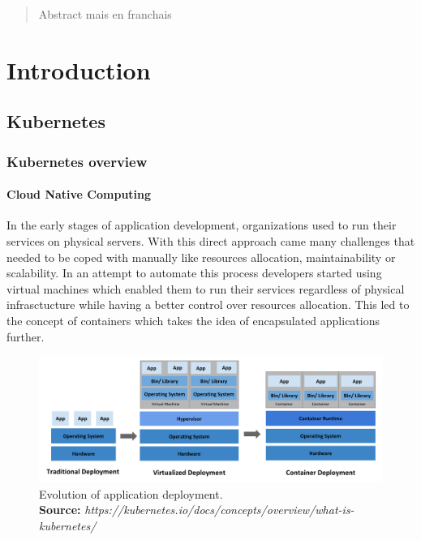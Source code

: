 \documentclass[12pt, a4paper]{memoir}
\newcommand*{\captionsource}[2]{%
    \caption[{#1}]{%
        #1%
        \\\hspace{\linewidth}%
	\textbf{Source:} \textit{#2}%
    }%
}
\begin{document}
\renewcommand\abstractname{R\'esum\'e}
\begin{abstract} 
	Abstract mais en franchais
\end{abstract}

\tableofcontents* %
\normalsize

\mainmatter
\SingleSpace

\chapter{Introduction}
\section{Kubernetes}
\subsection{Kubernetes overview}
\subsubsection{Cloud Native Computing}
In the early stages of application development, organizations used to run their
services on physical servers. With this direct approach came many challenges
that needed to be coped with manually like resources allocation,
maintainability or scalability. In an attempt to automate this process
developers started using virtual machines which enabled them to run their
services regardless of physical infrasctucture while having a better control
over resources allocation.  This led to the concept of containers which takes
the idea of encapsulated applications further.

\begin{figure}[h]
	\centering
	\includegraphics[width=\textwidth]{../imgs/container_evolution.png}
	\captionsource{Evolution of application deployment.}{https://kubernetes.io/docs/concepts/overview/what-is-kubernetes/}
	\label{fig:container-evolution}
\end{figure}
\end{document}
